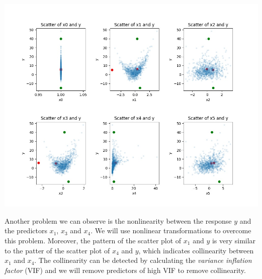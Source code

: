 \documentclass{article}
\begin{document}
\begin{center}
\includegraphics[width = 1\textwidth]{images/Scatter.jpg}
\end{center}

Another problem we can observe is the nonlinearity between the response $y$ and the predictors $x_1$, $x_3$ and $x_4$. We will use nonlinear transformations to overcome this problem. Moreover, the pattern of the scatter plot of $x_1$ and $y$ is very similar to the patter of the scatter plot of $x_4$ and $y$, which indicates collinearity between $x_1$ and $x_4$. The collinearity can be detected by calculating the \textit{variance inflation factor} (VIF) and we will remove predictors of high VIF to remove collinearity. 
\end{document}
